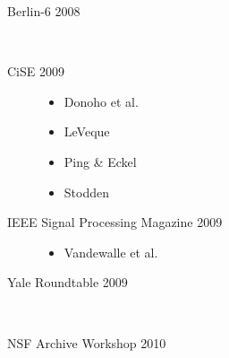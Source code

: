 \begin{frame}
\begin{minipage}{0.65\textwidth}
\begin{description}
    \item[Berlin-6 2008] \
    \item[CiSE 2009] 
    \begin{itemize}
    \item Donoho et al.
    \item LeVeque
    \item Ping \& Eckel
    \item Stodden
    \end{itemize}
    \item[IEEE Signal Processing Magazine 2009] 
    \begin{itemize}
    \item Vandewalle et al.
     \end{itemize}
     \item[Yale Roundtable 2009] \
     \item[NSF Archive Workshop 2010] \ 
   \end{description}
  \end{minipage}
\end{frame}

